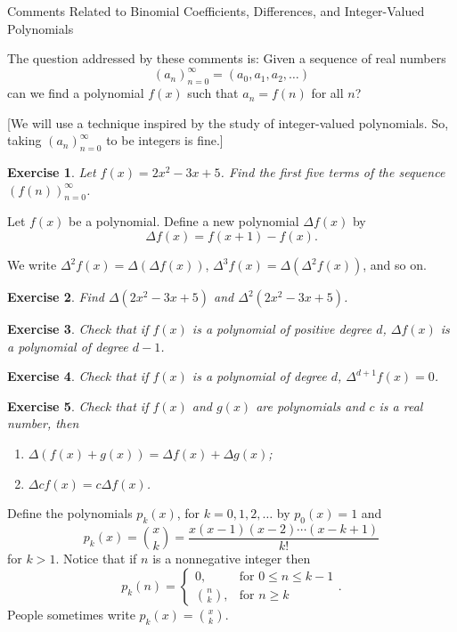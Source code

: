 \documentclass[12pt]{article}
\theoremstyle{plain}
\newtheorem{ex}{Exercise}
\begin{document}
Comments Related to Binomial Coefficients, Differences, and Integer-Valued Polynomials \vspace{\baselineskip}

The question addressed by these comments is: Given a sequence of real numbers
\[
  (a_n)_{n=0}^\infty=(a_0,a_1,a_2,\ldots)
\]
can we find a polynomial $f(x)$ such that $a_n=f(n)$ for all $n$?

[We will use a technique inspired by the study of integer-valued polynomials. So, taking $(a_n)_{n=0}^\infty$ to be integers is fine.]

\begin{ex}
  Let $f(x)=2x^2-3x+5$. Find the first five terms of the sequence $(f(n))_{n=0}^\infty$.
\end{ex}

Let $f(x)$ be a polynomial. Define a new polynomial $\Delta f(x)$ by 
\[
  \Delta f(x)=f(x+1)-f(x).
\]

We write $\Delta^2f(x)=\Delta(\Delta f(x))$, $\Delta^3f(x)=\Delta(\Delta^2f(x))$, and so on.

\begin{ex}
  Find $\Delta(2x^2-3x+5)$ and $\Delta^2(2x^2-3x+5)$.
\end{ex}

\begin{ex}
  Check that if $f(x)$ is a polynomial of positive degree $d$, $\Delta f(x)$ is a polynomial of degree $d-1$.
\end{ex}

\begin{ex}
  Check that if $f(x)$ is a polynomial of degree $d$, $\Delta^{d+1}f(x)=0$.
\end{ex}

\begin{ex}
  Check that if $f(x)$ and $g(x)$ are polynomials and $c$ is a real number, then
  \begin{enumerate}[1.]
    \item $\Delta(f(x)+g(x))=\Delta f(x)+\Delta g(x)$;
    \item $\Delta cf(x)=c\Delta f(x)$.
  \end{enumerate}
\end{ex}

Define the polynomials $p_k(x)$, for $k=0,1,2,\ldots$ by $p_0(x)=1$ and
\[
  p_k(x)=\binom{x}{k}=\frac{x(x-1)(x-2)\cdots(x-k+1)}{k!}
\]
for $k>1$. Notice that if $n$ is a nonnegative integer then
\[
  p_k(n)=
  \begin{cases}
    0,            & \text{for } 0\leq n\leq k-1 \\
    \binom{n}{k}, & \text{for } n\geq k
  \end{cases}.
\]
People sometimes write $p_k(x)=\binom{x}{k}$.
\end{document}
